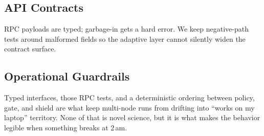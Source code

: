 \subsection{API Contracts}

RPC payloads are typed; garbage-in gets a hard error. We keep negative-path tests around malformed fields so the adaptive layer cannot silently widen the contract surface.

\subsection{Operational Guardrails}

Typed interfaces, those RPC tests, and a deterministic ordering between policy, gate, and shield are what keep multi-node runs from drifting into ``works on my laptop'' territory. None of that is novel science, but it is what makes the behavior legible when something breaks at 2\,am.
